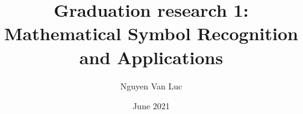 \documentclass[a4paper,10pt]{article}
\title{Graduation research 1:
\\
\large Mathematical Symbol Recognition and Applications
}
\author{Nguyen Van Luc}
\date{June 2021}
\begin{document}

\tableofcontents

\newpage


%
%
%
%
%
%
%



\nocite{*}
\end{document}
